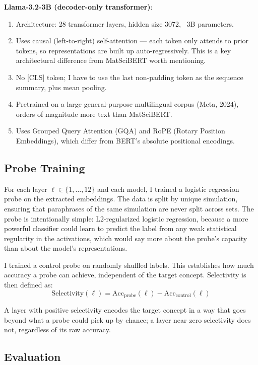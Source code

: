 \documentclass[11pt]{article}
\begin{document}
\textbf{Llama-3.2-3B (decoder-only transformer)}:
\begin{enumerate}
    \item Architecture: 28 transformer layers, hidden size 3072, ~3B parameters.
    \item Uses causal (left-to-right) self-attention — each token only attends to prior tokens, so representations are built up auto-regressively. This is a key architectural difference from MatSciBERT worth mentioning.
    \item No [CLS] token; I have to use the last non-padding token as the sequence summary, plus mean pooling.
    \item Pretrained on a large general-purpose multilingual corpus (Meta, 2024), orders of magnitude more text than MatSciBERT.
    \item Uses Grouped Query Attention (GQA) and RoPE (Rotary Position Embeddings), which differ from BERT's absolute positional encodings.
\end{enumerate}

\subsection{Probe Training}

For each layer $\ell \in \{1, \ldots, 12\}$ and each model, I trained a logistic regression probe on the extracted embeddings. The data is split by unique simulation, ensuring that paraphrases of the same simulation are never split across sets. The probe is intentionally simple: L2-regularized logistic regression, because a more powerful classifier could learn to predict the label from any weak statistical regularity in the activations, which would say more about the probe's capacity than about the model's representations.

I trained a control probe on randomly shuffled labels. This establishes how much accuracy a probe can achieve, independent of the target concept. Selectivity is then defined as:
\begin{equation}
    \text{Selectivity}(\ell) = \text{Acc}_{\text{probe}}(\ell) - \text{Acc}_{\text{control}}(\ell)
\end{equation}

A layer with positive selectivity encodes the target concept in a way that goes beyond what a probe could pick up by chance; a layer near zero selectivity does not, regardless of its raw accuracy.

\subsection{Evaluation}
\end{document}
